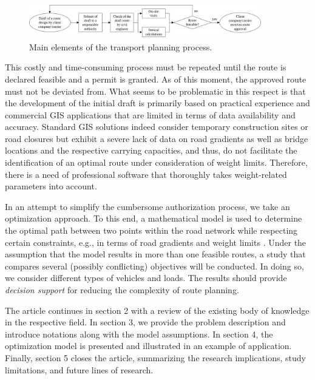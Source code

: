 \begin{figure}[!ht]
  \centering
  \includegraphics[width=0.9\textwidth]{final.jpg}
  \caption{Main elements of the \ohc transport planning process.}
  \label{fig:higher level}
\end{figure}

This costly and time-consuming process must be repeated until the route is declared feasible and a permit is granted. As of this moment, the approved route must not be deviated from.
What seems to be problematic in this respect is that the development of the initial draft is primarily based on practical experience and commercial GIS applications that are limited in terms of data availability and accuracy.
Standard GIS solutions indeed consider temporary construction sites or road closures but exhibit a severe lack of data on road gradients as well as bridge locations and the respective carrying capacities, and thus, do not facilitate the identification of an optimal route under consideration of weight limits.
Therefore, there is a need of professional software that thoroughly takes weight-related parameters into account.
\par In an attempt to simplify the cumbersome authorization process, we take an optimization approach.
To this end, a mathematical model is used to determine the optimal path between two points within the road network while respecting certain constraints, e.g., in terms of road gradients and weight limits \cite{liedtke2012generation, zhu2014vehicle}.
Under the assumption that the model results in more than one feasible routes, a study that compares several (possibly conflicting) objectives will be conducted.
In doing so, we consider different types of vehicles and loads. The results should provide \textit{decision support} for reducing the complexity of \ohc route planning.
\par
The article continues in section 2 with a review of the existing body of knowledge in the respective field.
In section 3, we provide the problem description and introduce notations along with the model assumptions. In section 4, the optimization model is presented and illustrated in an example of application.
Finally, section 5 closes the article, summarizing the research implications, study limitations, and future lines of research.

